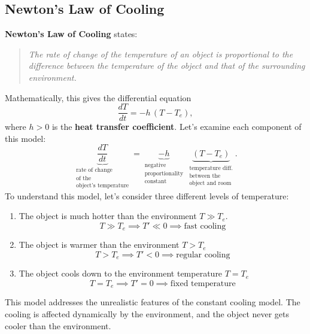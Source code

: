 \documentclass[09pt,letterpaper]{article}
\begin{document}
\subsection{Newton’s Law of Cooling}

\textbf{Newton’s Law of Cooling} states:

\begin{quote}
\textit{The rate of change of the temperature of an object is proportional to the difference between the temperature of the object and that of the surrounding environment.}
\end{quote}
Mathematically, this gives the differential equation
\[
\boxed{
\frac{dT}{dt} = -h\,(T - T_e),
}
\]
where $h>0$ is the \textbf{heat transfer coefficient}. Let's examine each component of this model:
\[
\underbrace{\frac{dT}{dt}}_{
  \begin{array}{c}
    \text{rate of change }\\
    \text{of the}\\
    \text{object's temperature}
  \end{array}
}
=
\underbrace{-h}_{
  \begin{array}{c}
    \text{negative}\\
    \text{proportionality}\\
    \text{constant}
  \end{array}
}
\,\underbrace{(T-T_e)}_{
  \begin{array}{c}
    \text{temperature diff.}\\
    \text{between the}\\
    \text{object and room}
  \end{array}
}.
\]
To understand this model, let's consider three different levels of temperature:
\begin{enumerate}
    \item The object is much hotter than the environment $T\gg T_e$. 
        $$T\gg T_e \implies T'\ll 0\implies \text{fast cooling}$$
    \item The object is warmer than the environment $T > T_e$
        $$ T >T_e \implies T'<0 \implies \text{regular cooling}$$
    \item The object cools down to the environment temperature $T=T_e$
    $$ T = T_e \implies T'=0\implies \text{fixed temperature}$$
\end{enumerate}
This model addresses the unrealistic features of the constant cooling model. The cooling is affected dynamically by the environment, and the object never gets cooler than the environment.
\end{document}
